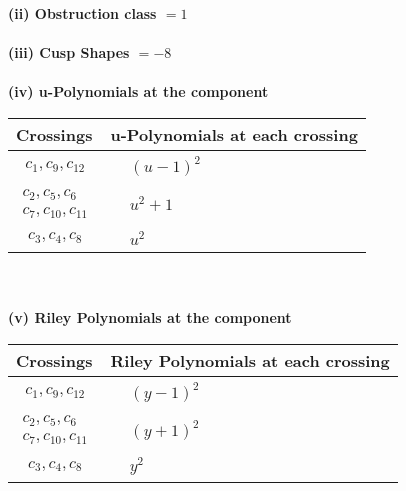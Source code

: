 \documentclass[1p]{elsarticle_modified}
\theoremstyle{definition}
\begin{document}
\flushleft \textbf{(ii) Obstruction class $= 1$}\\~\\
\flushleft \textbf{(iii) Cusp Shapes $= -8$}\\~\\
\newpage\renewcommand{\arraystretch}{1}
\flushleft \textbf{(iv) u-Polynomials at the component}\newline \\
\begin{tabular}{m{50pt}|m{274pt}}
Crossings & \hspace{64pt}u-Polynomials at each crossing \\
\hline $$\begin{aligned}c_{1},c_{9},c_{12}\end{aligned}$$&$\begin{aligned}
&(u-1)^2
\end{aligned}$\\
\hline $$\begin{aligned}c_{2},c_{5},c_{6}\\c_{7},c_{10},c_{11}\end{aligned}$$&$\begin{aligned}
&u^2+1
\end{aligned}$\\
\hline $$\begin{aligned}c_{3},c_{4},c_{8}\end{aligned}$$&$\begin{aligned}
&u^2
\end{aligned}$\\
\hline
\end{tabular}\\~\\
\newpage\renewcommand{\arraystretch}{1}
\flushleft \textbf{(v) Riley Polynomials at the component}\newline \\
\begin{tabular}{m{50pt}|m{274pt}}
Crossings & \hspace{64pt}Riley Polynomials at each crossing \\
\hline $$\begin{aligned}c_{1},c_{9},c_{12}\end{aligned}$$&$\begin{aligned}
&(y-1)^2
\end{aligned}$\\
\hline $$\begin{aligned}c_{2},c_{5},c_{6}\\c_{7},c_{10},c_{11}\end{aligned}$$&$\begin{aligned}
&(y+1)^2
\end{aligned}$\\
\hline $$\begin{aligned}c_{3},c_{4},c_{8}\end{aligned}$$&$\begin{aligned}
&y^2
\end{aligned}$\\
\hline
\end{tabular}\\~\\
\end{document}
